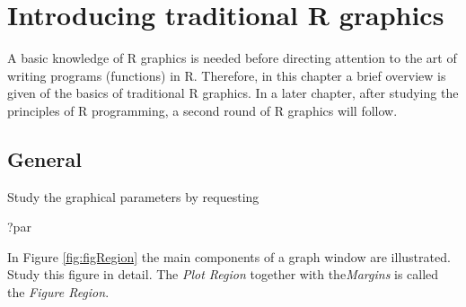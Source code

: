 \documentclass[
]{book}
\newenvironment{Shaded}{\begin{snugshade}}{\end{snugshade}}
\newcommand{\NormalTok}[1]{#1}
\begin{document}
\chapter{Introducing traditional R graphics}\label{graphics}

A basic knowledge of R graphics is needed before directing attention to the art of writing programs (functions) in R. Therefore, in this chapter a brief overview is given of the basics of traditional R graphics. In a later chapter, after studying the principles of R programming, a second round of R graphics will follow.

\section{General}\label{general-1}

Study the graphical parameters by requesting

\begin{Shaded}
\begin{Highlighting}[]
\NormalTok{?par}
\end{Highlighting}
\end{Shaded}

In Figure \ref{fig:figRegion} the main components of a graph window are illustrated. Study this figure in detail. The \emph{{Plot Region}} together with the\emph{{Margins}} is called the \emph{{Figure Region}}.
\end{document}
